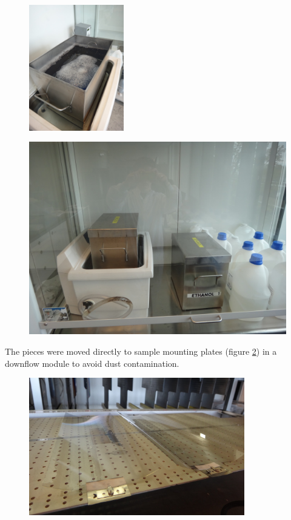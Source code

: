 \begin{figure}[htbp]
\centering
\begin{minipage}{.5\textwidth}
  \centering
  \includegraphics[height=5.5cm]{figures/cast/soap_bath.jpg}
  \label{fig:cast_cleaning_soap}
\end{minipage}%
\begin{minipage}{.5\textwidth}
  \centering
  \includegraphics[width=0.9\linewidth]{figures/cast/acetone_and_ethanol.jpg}
  \label{fig:cast_cleaning_ethanol}
\end{minipage}
\end{figure}

The pieces were moved directly to sample mounting plates (figure \ref{fig:coating_mount}) in a downflow module to avoid dust contamination.

\begin{figure}[htbp]
  \centering
    \includegraphics[height=6cm]{figures/cast/coating_mount.jpg}
  \caption{\footnotesize }
  \label{fig:coating_mount}
\end{figure}

